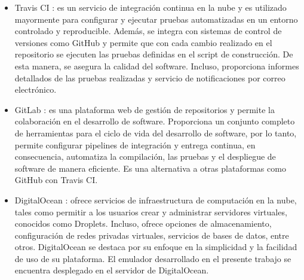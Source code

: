 \begin{itemize}
	\item Travis CI \citep{TravisCI}: es un servicio de integración continua en la nube y es utilizado mayormente para configurar y ejecutar pruebas automatizadas en un entorno controlado y reproducible. Además, se integra con sistemas de control de versiones como GitHub y permite que con cada cambio realizado en el repositorio se ejecuten las pruebas definidas en el script de construcción.
De esta manera, se asegura la calidad del software. Incluso, proporciona informes detallados de las pruebas realizadas y servicio de notificaciones por correo electrónico.

	\item GitLab \citep{GitLab}: es una plataforma web de gestión de repositorios y permite la colaboración en el desarrollo de software. Proporciona un conjunto completo de herramientas para el ciclo de vida del desarrollo de software, por lo tanto, permite configurar pipelines de integración y entrega continua, en consecuencia, automatiza la compilación, las pruebas y el despliegue de software de manera eficiente. Es una alternativa a otras plataformas como GitHub con Travis CI.
	
	\item DigitalOcean \citep{DigitalOcean}: ofrece servicios de infraestructura de computación en la nube, tales como permitir a los usuarios crear y administrar servidores virtuales, conocidos como Droplets. Incluso, ofrece opciones de almacenamiento, configuración de redes privadas virtuales, servicios de bases de datos, entre otros. DigitalOcean se destaca por su enfoque en la simplicidad y la facilidad de uso de su plataforma. El emulador desarrollado en el presente trabajo se encuentra desplegado en el servidor de DigitalOcean.

	
\end{itemize}
